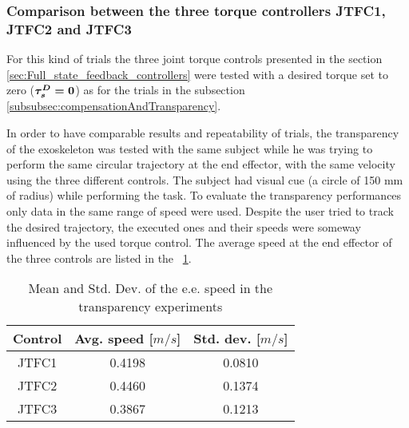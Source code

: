 \subsubsection{Comparison between the three torque controllers JTFC1, JTFC2 and JTFC3}
For this kind of trials the three joint torque controls presented in the section \ref{sec:Full_state_feedback_controllers} were tested with a desired torque set to zero (${ \boldsymbol {\tau_s^D=0}}$) as for the trials in the subsection \ref{subsubsec:compensationAndTransparency}. 
\par In order to have comparable results and repeatability of trials, the transparency of the exoskeleton was tested with the same subject while he was trying to perform the same circular trajectory at the end effector, with the same velocity using the three different controls. The subject had visual cue (a circle of 150 mm of radius) while performing the task.
To evaluate the transparency performances only data in the same range of speed were used.
Despite the user tried to track the desired trajectory, the executed ones and their speeds were someway influenced by the used torque control. The average speed at the end effector of the three controls are listed in the \tablename \ \ref{tab:transparencySpeeds}.
%
\begin{table}[]
	\renewcommand{\arraystretch}{1.3}
	\caption{Mean and Std. Dev. of the e.e. speed in the transparency experiments}
	\label{tab:transparencySpeeds}
	\centering
	\begin{tabular}{c c c}
		\hline \hline
		\bfseries Control & \bfseries Avg. speed [$m/s$] & \bfseries Std. dev. [$m/s$]\\
		\hline
		JTFC1 & 0.4198 & 0.0810\\
		JTFC2 & 0.4460 & 0.1374\\
		JTFC3 & 0.3867 & 0.1213\\
		\hline \hline
	\end{tabular}
\end{table}
